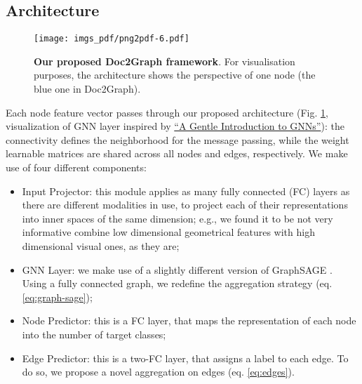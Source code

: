 \documentclass[runningheads]{llncs}
\begin{document}
\subsection{Architecture}
\label{sec:architecture}
\begin{figure}[t]
    \centering
    \texttt{[image: imgs\_pdf/png2pdf-6.pdf]}
    \caption{\textbf{Our proposed Doc2Graph framework}. For visualisation purposes, the architecture shows the perspective of one node (the blue one in Doc2Graph).}
    \label{fig:model}
\end{figure}
Each node feature vector passes through our proposed architecture (Fig. \ref{fig:model}, visualization of GNN layer inspired by \href{https://distill.pub/2021/gnn-intro/}{``A Gentle Introduction to GNNs''}): the connectivity defines the neighborhood for the message passing, while the weight learnable matrices are shared across all nodes and edges, respectively. We make use of four different components:
\begin{itemize}
    \item Input Projector: this module applies as many fully connected (FC) layers as there are different modalities in use, to project each of their representations into inner spaces of the same dimension; e.g., we found it to be not very informative combine low dimensional geometrical features with high dimensional visual ones, as they are;
    \item GNN Layer: we make use of a slightly different version of GraphSAGE \cite{hamilton2017inductive}. Using a fully connected graph, we redefine the aggregation strategy (eq. \ref{eq:graph-sage});
    \item Node Predictor: this is a FC layer, that maps the representation of each node into the number of target classes;
    \item Edge Predictor: this is a two-FC layer, that assigns a label to each edge.  To do so, we propose a novel aggregation on edges (eq. \ref{eq:edges}).
\end{itemize}
\end{document}
